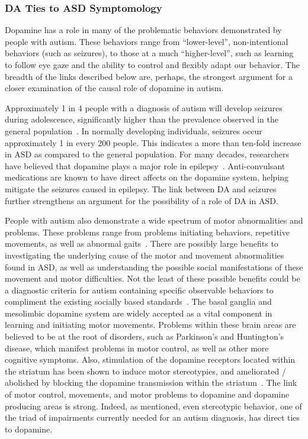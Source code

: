 \subsubsection{DA Ties to ASD Symptomology}
	Dopamine has a role in many of the problematic behaviors demonstrated by people with autism.  These behaviors range from “lower-level”, non-intentional behaviors (such as seizures), to those at a much “higher-level”, such as learning to follow eye gaze and the ability to control and flexibly adapt our behavior.  The breadth of the links described below are, perhaps, the strongest argument for a closer examination of the causal role of dopamine in autism.

Approximately 1 in 4 people with a diagnosis of autism will develop seizures during adolescence, significantly higher than the prevalence observed in the general population~\cite{RefWorks:102}.  In normally developing individuals, seizures occur approximately 1 in every 200 people. This indicates a more than ten-fold increase in ASD as compared to the general population.  For many decades, researchers have believed that dopamine plays a major role in epilepsy~\cite{RefWorks:1}.  Anti-convulsant medications are known to have direct affects on the dopamine system, helping mitigate the seizures caused in epilepsy.  The link between DA and seizures further strengthens an argument for the possibility of a role of DA in ASD.

People with autism also demonstrate a wide spectrum of motor abnormalities and problems. These problems range from problems initiating behaviors, repetitive movements, as well as abnormal gaits~\cite{RefWorks:100,RefWorks:99,RefWorks:98}. There are possibly large benefits to investigating the underlying  cause of the motor and movement abnormalities found in ASD, as well as understanding the possible social manifestations of these movement and motor difficulties. Not the least of these possible benefits could be a diagnostic criteria for autism containing specific observable behaviors to compliment the existing socially based standards~\cite{RefWorks:162}. The basal ganglia and mesolimbic dopamine system are widely accepted as a vital component in learning and initiating motor movements. Problems within these brain areas are believed to be at the root of disorders, such as Parkinson's and Huntington's disease, which manifest problems in motor control, as well as other more cognitive symptoms.  Also, stimulation of the dopamine receptors located within the striatum has been shown to induce motor stereotypies, and ameliorated / abolished by blocking the dopamine transmission within the striatum~\cite{Canales:2000:DA_Stereotypy,RefWorks:3,RefWorks:5}. The link of motor control, movements, and motor problems to dopamine and dopamine producing areas is strong. Indeed, as mentioned, even stereotypic behavior, one of the triad of impairments currently needed for an autism diagnosis, has direct ties to dopamine. 

